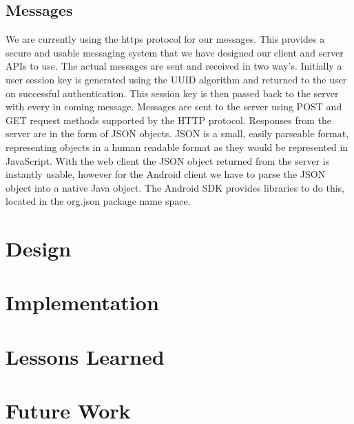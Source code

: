 \documentclass{dependencies/acm_proc_article-sp}
\begin{document}
\subsection{Messages}
We are currently using the https protocol for our messages. This provides a secure
and usable messaging system that we have designed our client and server APIs to use.
The actual messages are sent and received in two way's. Initially a user session key is
generated using the UUID\cite{uuid} algorithm and returned to the user on successful
authentication. This session key is then passed back to the server with every in coming
message. Messages are sent to the server using POST and GET request methods supported
by the HTTP protocol. Responses from the server are in the form of JSON \cite{json} objects.
JSON is a small, easily parseable format, representing objects in a human readable format as
they would be represented in JavaScript. With the web client the JSON object returned from
the server is instantly usable, however for the Android client we have to parse the JSON object
into a native Java object. The Android SDK provides libraries to do this, located in the
org.json \cite{orgjson} package name space.

\section{Design}

\section{Implementation}

\section{Lessons Learned}

\section{Future Work}

\newpage
%

%
%
\balancecolumns
\end{document}
